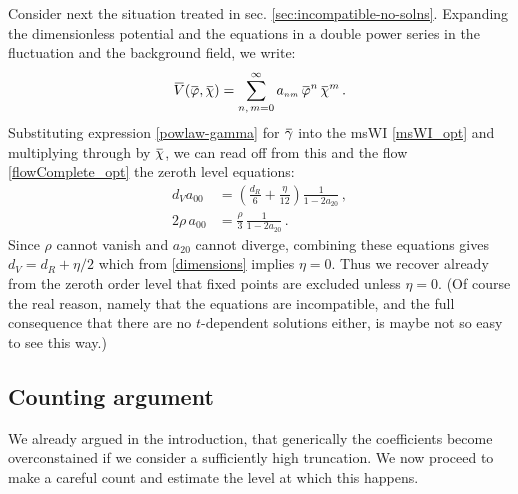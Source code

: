 \documentclass[11pt]{book}
\newcommand{\overbar}[1]{\mkern 1.5mu\overline{\mkern-1.5mu#1\mkern-1.5mu}\mkern 1.5mu}
\newcommand{\bV}{\overbar V}
\newcommand{\bp}{\overbar \varphi}
\newcommand{\bg}{\overbar \gamma}
\newcommand{\bc}{\overbar \chi}
\numberwithin{equation}{chapter}
\begin{document}
Consider next the situation treated in sec. \ref{sec:incompatible-no-solns}.
Expanding the dimensionless potential and the equations in a double power series in the fluctuation and
the background field, we write:
\begin{align}
  \label{pot-expand}
  \bV(\bp,\bc) = \sum_{n,\,m=0}^{\infty} a_{\scriptscriptstyle nm} \, \bp^n \, \bc^m\,.
\end{align}
Substituting expression \eqref{powlaw-gamma} for $\bg$ into the msWI \eqref{msWI_opt}
and multiplying through by $\bc$,
we can read off from this and the flow \eqref{flowComplete_opt} the zeroth level equations:
\begin{align}
  d_V a_{\scriptscriptstyle 00}
  &= \left(  \frac{d_R}{6} + \frac{\eta}{12} \right) \frac{1}{1 -  2a_{\scriptscriptstyle 20}} \,, \\
  2\rho\, a_{\scriptscriptstyle 00}
  &= \frac{\rho}{3} \, \frac{1}{1 -  2a_{\scriptscriptstyle 20}} \,.
\end{align}
Since $\rho$ cannot vanish and $a_{\scriptscriptstyle 20}$ cannot diverge,
combining these equations gives $d_V = d_R+\eta/2$ which from \eqref{dimensions} implies $\eta=0$.
Thus we recover already from the zeroth order level that fixed points are excluded unless $\eta=0$.
(Of course the real reason, namely that the equations are incompatible,
and the full consequence that there are no $t$-dependent solutions either,
is maybe not so easy to see this way.)


\subsection{Counting argument}\label{sec:counting}

We already argued in the introduction, that generically the coefficients become overconstained if we
consider a sufficiently high truncation. We now proceed to make a careful count and estimate the
level at which this happens.
\end{document}
